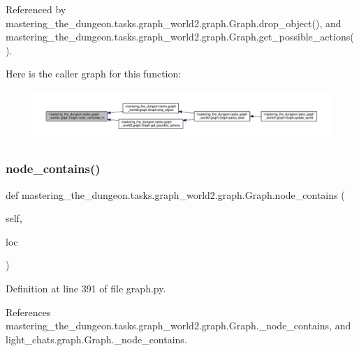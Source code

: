 Referenced by mastering\+\_\+the\+\_\+dungeon.\+tasks.\+graph\+\_\+world2.\+graph.\+Graph.\+drop\+\_\+object(), and mastering\+\_\+the\+\_\+dungeon.\+tasks.\+graph\+\_\+world2.\+graph.\+Graph.\+get\+\_\+possible\+\_\+actions().

Here is the caller graph for this function\+:
\nopagebreak
\begin{figure}[H]
\begin{center}
\leavevmode
\includegraphics[width=350pt]{classmastering__the__dungeon_1_1tasks_1_1graph__world2_1_1graph_1_1Graph_ad7537af58a534364e66ca5f22391d883_icgraph}
\end{center}
\end{figure}
\mbox{\label{classmastering__the__dungeon_1_1tasks_1_1graph__world2_1_1graph_1_1Graph_ab86314e0d6d56dae57a5072c4f9b749f}} 
\subsubsection{\texorpdfstring{node\+\_\+contains()}{node\_contains()}}
{\footnotesize\ttfamily def mastering\+\_\+the\+\_\+dungeon.\+tasks.\+graph\+\_\+world2.\+graph.\+Graph.\+node\+\_\+contains (\begin{DoxyParamCaption}\item[{}]{self,  }\item[{}]{loc }\end{DoxyParamCaption})}



Definition at line 391 of file graph.\+py.



References mastering\+\_\+the\+\_\+dungeon.\+tasks.\+graph\+\_\+world2.\+graph.\+Graph.\+\_\+node\+\_\+contains, and light\+\_\+chats.\+graph.\+Graph.\+\_\+node\+\_\+contains.



